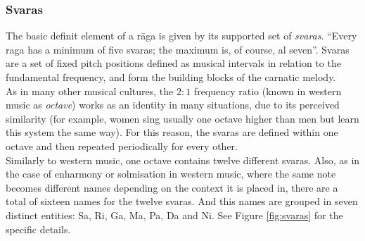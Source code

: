 \subsubsection{Svaras}

The basic definit element of a r\=aga is given by its supported set of {\it svaras}. ``Every raga has a minimum of five svaras; the maximum is, of course, al seven''\cite[p.53]{krishna}. Svaras are a set of fixed pitch positions\cite[p.46]{krishna} defined as musical intervals in relation to the fundamental frequency, and form the building blocks of the carnatic melody.\\

As in many other musical cultures, the \(2:1\) frequency ratio (known in western music as {\it octave}) works as an identity in many situations, due to its perceived similarity (for example, women sing usually one octave higher than men but learn this system the same way). For this reason, the svaras are defined within one octave and then repeated periodically for every other.\\

Similarly to western music, one octave contains twelve different svaras. Also, as in the case of enharmony or solmisation in western music, where the same note becomes different names depending on the context it is placed in, there are a total of sixteen names for the twelve svaras. And this names are grouped in seven distinct entities: Sa, Ri, Ga, Ma, Pa, Da and Ni. See Figure \ref{fig:svaras} for the specific details.\\

